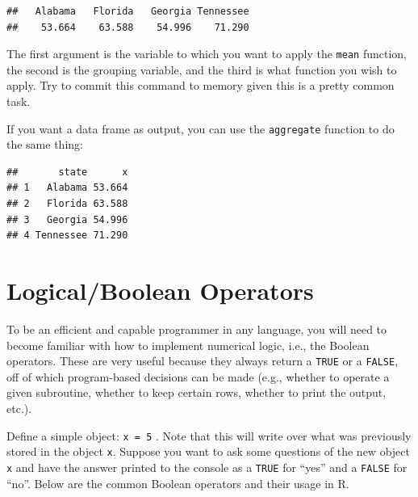\documentclass[]{book}
\newenvironment{Shaded}{\begin{snugshade}}{\end{snugshade}}
\newcommand{\KeywordTok}[1]{\textcolor[rgb]{0.13,0.29,0.53}{\textbf{#1}}}
\newcommand{\DataTypeTok}[1]{\textcolor[rgb]{0.13,0.29,0.53}{#1}}
\newcommand{\OperatorTok}[1]{\textcolor[rgb]{0.81,0.36,0.00}{\textbf{#1}}}
\newcommand{\NormalTok}[1]{#1}
\theoremstyle{definition}
\theoremstyle{definition}
\theoremstyle{definition}
\theoremstyle{remark}
\begin{document}
\begin{Shaded}
\end{Shaded}

\begin{verbatim}
##   Alabama   Florida   Georgia Tennessee 
##    53.664    63.588    54.996    71.290
\end{verbatim}

The first argument is the variable to which you want to apply the
\texttt{mean} function, the second is the grouping variable, and the
third is what function you wish to apply. Try to commit this command to
memory given this is a pretty common task.

If you want a data frame as output, you can use the \texttt{aggregate}
function to do the same thing:

\begin{Shaded}
\end{Shaded}

\begin{verbatim}
##       state      x
## 1   Alabama 53.664
## 2   Florida 63.588
## 3   Georgia 54.996
## 4 Tennessee 71.290
\end{verbatim}

\section{Logical/Boolean Operators}\label{logicalboolean-operators}

To be an efficient and capable programmer in any language, you will need
to become familiar with how to implement numerical logic, i.e., the
Boolean operators. These are very useful because they always return a
\texttt{TRUE} or a \texttt{FALSE}, off of which program-based decisions
can be made (e.g., whether to operate a given subroutine, whether to
keep certain rows, whether to print the output, etc.).

Define a simple object: \texttt{x\ =\ 5} . Note that this will write
over what was previously stored in the object \texttt{x}. Suppose you
want to ask some questions of the new object \texttt{x} and have the
answer printed to the console as a \texttt{TRUE} for ``yes'' and a
\texttt{FALSE} for ``no''. Below are the common Boolean operators and
their usage in R.
\end{document}
